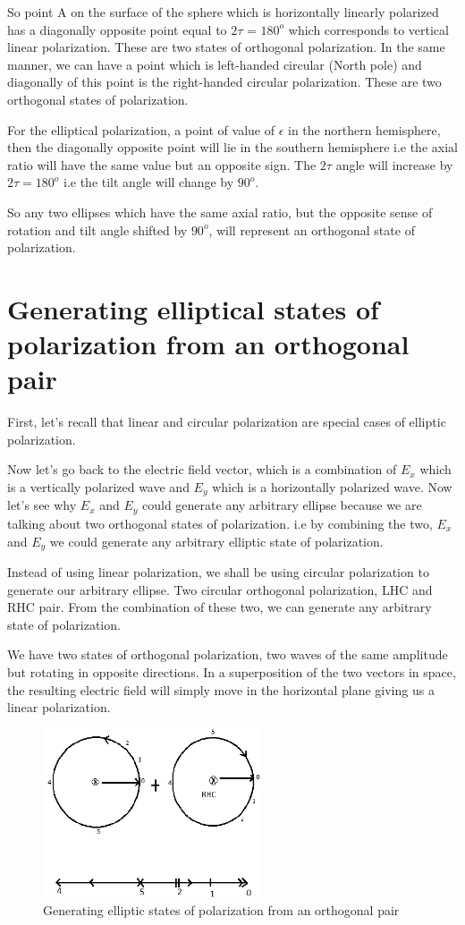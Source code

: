 So point A on the surface of the sphere which is horizontally linearly polarized has a diagonally opposite point equal to $2\tau$ = $180^{o}$ which corresponds to vertical linear polarization. These are two states of orthogonal polarization. In the same manner, we can have a point which is left-handed circular (North pole) and diagonally of this point is the right-handed circular polarization. These are two orthogonal states of polarization.

For the elliptical polarization, a point of value of $\epsilon$ in the northern hemisphere, then the diagonally opposite point will lie in the southern hemisphere i.e the axial ratio will have the same value but an opposite sign. The $2\tau$ angle will increase by $2\tau = 180^{o}$ i.e the tilt angle will change by $90^{o}$.

So any two ellipses which have the same axial ratio, but the opposite sense of rotation and tilt angle shifted by $90^{o}$, will represent an orthogonal state of polarization.

\section{Generating elliptical states of polarization from an orthogonal pair}
First, let's recall that linear and circular polarization are special cases of elliptic polarization. 

Now let's go back to the electric field vector, which is a combination of $E_{x}$ which is a vertically polarized wave and $E_{y}$ which is a horizontally polarized wave. Now let's see why $E_{x}$ and $E_{y}$ could generate any arbitrary ellipse because we are talking about two orthogonal states of polarization. i.e by combining the two, $E_{x}$ and $E_{y}$ we could generate any arbitrary elliptic state of polarization.

Instead of using linear polarization, we shall be using circular polarization to generate our arbitrary ellipse. Two circular orthogonal polarization, LHC and RHC pair. From the combination of these two, we can generate any arbitrary state of polarization. 

We have two states of orthogonal polarization, two waves of the same amplitude but rotating in opposite directions. In a superposition of the two vectors in space, the resulting electric field will simply move in the horizontal plane giving us a linear polarization.
\begin{figure}[h]
\centering
\includegraphics[height=5cm]{"./graphics/linear polarized"}
\caption{Generating elliptic states of polarization from an orthogonal pair}
\label{fig:linear-polarized}
\end{figure}

